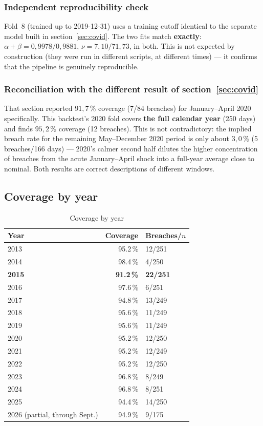 \documentclass[12pt,a4paper]{article}
\begin{document}
	\newpage
	
	\subsubsection{Independent reproducibility check}
	
	Fold~8 (trained up to 2019-12-31) uses a training cutoff
	identical to the separate model built in
	section~\ref{sec:covid}. The two fits match
	\textbf{exactly}: $\alpha+\beta = 0{,}9978/0{,}9881$,
	$\nu = 7{,}10/71{,}73$, in both. This is not expected by
	construction (they were run in different scripts, at
	different times) --- it confirms that the pipeline is genuinely
	reproducible.
	
	\subsubsection{Reconciliation with the different result of section~\ref{sec:covid}}
	
	That section reported $91{,}7\,\%$ coverage (7/84 breaches)
	for January--April 2020 specifically. This backtest's
	2020 fold covers \textbf{the full calendar year} (250 days) and finds
	$95{,}2\,\%$ coverage (12 breaches). This is not
	contradictory: the implied breach rate for the remaining
	May--December 2020 period is only about $3{,}0\,\%$
	(5 breaches/166 days) --- 2020's calmer second half
	dilutes the higher concentration of breaches from the
	acute January--April shock into a full-year average close
	to nominal. Both results are correct descriptions of different
	windows.
	
	\subsection{Coverage by year}
	
	\begin{table}[H]
		\centering
		\small
		\caption{Coverage by year}
		\begin{tabular}{lrl}
			\toprule
			Year & Coverage & Breaches/$n$ \\
			\midrule
			2013 & 95.2\,\% & 12/251 \\
			2014 & 98.4\,\% & 4/250 \\
			\textbf{2015} & \textbf{91.2\,\%} & \textbf{22/251} \\
			2016 & 97.6\,\% & 6/251 \\
			2017 & 94.8\,\% & 13/249 \\
			2018 & 95.6\,\% & 11/249 \\
			2019 & 95.6\,\% & 11/249 \\
			2020 & 95.2\,\% & 12/250 \\
			2021 & 95.2\,\% & 12/249 \\
			2022 & 95.2\,\% & 12/250 \\
			2023 & 96.8\,\% & 8/249 \\
			2024 & 96.8\,\% & 8/251 \\
			2025 & 94.4\,\% & 14/250 \\
			2026 (partial, through Sept.) & 94.9\,\% & 9/175 \\
			\bottomrule
		\end{tabular}
	\end{table}
	
\end{document}
